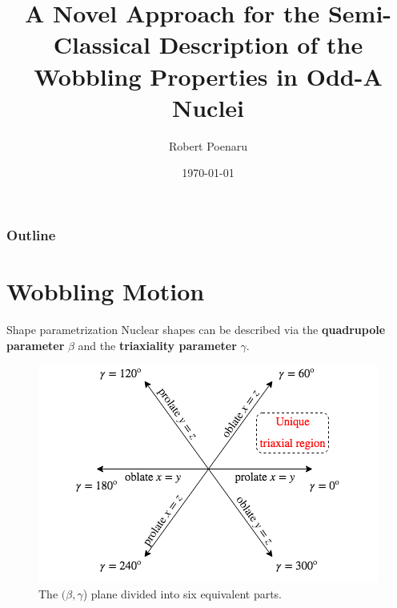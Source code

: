 \documentclass{beamer}
\title[Wobbling Motion in odd-A nuclei]{A Novel Approach for the Semi-Classical Description of the Wobbling Properties in Odd-A Nuclei} %
\author{Robert Poenaru} %
\institute[DFT] %
{
Department of Theoretical Physics, IFIN-HH \\
\vspace{0.1cm}
Faculty of Physics, University of Bucharest \\%
\medskip
\textit{robert.poenaru@drd.unibuc.ro} %
}
\date{\today} %
\begin{document}
\begin{frame}
\titlepage %
\end{frame}

\begin{frame}
\frametitle{Outline} %
\tableofcontents %
\end{frame}


\section{Wobbling Motion} 

\begin{frame}{Shape parametrization}
Nuclear shapes can be described via the \textbf{quadrupole parameter} $\beta$ and the \textbf{triaxiality parameter} $\gamma$.
\begin{figure}
    \centering
    \includegraphics[scale=0.5]{figs/beta_gamma_plane.png}
    \caption{The $(\beta,\gamma$) plane divided into six equivalent parts.}
    \label{betagamma}
\end{figure}
\end{frame}
\end{document}

